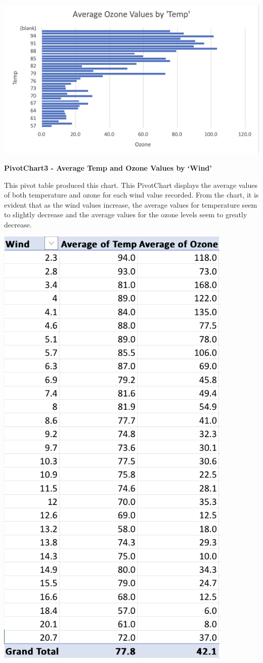 \documentclass[
  letterpaper,
  DIV=11,
  numbers=noendperiod]{scrreprt}
\begin{document}
\includegraphics{PivotChart2_AverageOzoneByTemp_Pena.png}

\textbf{PivotChart3 - Average Temp and Ozone Values by `Wind'}

This pivot table produced this chart. This PivotChart displays the
average values of both temperature and ozone for each wind value
recorded. From the chart, it is evident that as the wind values
increase, the average values for temperature seem to slightly decrease
and the average values for the ozone levels seem to greatly decrease.

\includegraphics{PivotTable3_AverTempOzoneByWind_Pena.png}
\end{document}
